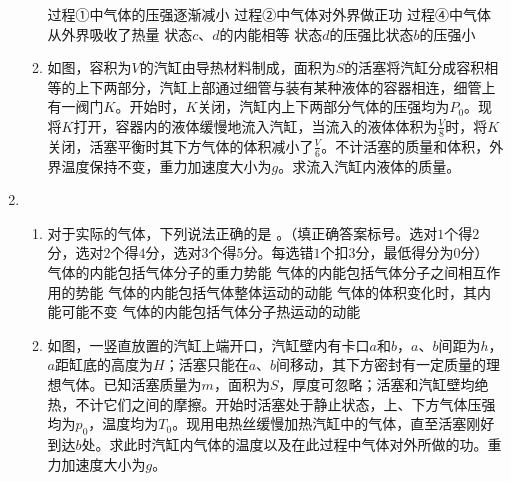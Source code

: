 \begin{enumerate}[leftmargin=0em]
\begin{enumerate}
\fivechoices
{过程①中气体的压强逐渐减小}
{过程②中气体对外界做正功}
{过程④中气体从外界吸收了热量}
{状态$ c $、$ d $的内能相等}
{状态$ d $的压强比状态$ b $的压强小}

\item 
如图，容积为$ V $的汽缸由导热材料制成，面积为$ S $的活塞将汽缸分成容积相等的上下两部分，汽缸上部通过细管与装有某种液体的容器相连，细管上有一阀门$ K $。开始时，$ K $关闭，汽缸内上下两部分气体的压强均为$ P_{0} $。现将$ K $打开，容器内的液体缓慢地流入汽缸，当流入的液体体积为$ \frac{V}{8} $时，将$ K $关闭，活塞平衡时其下方气体的体积减小了$ \frac{V}{6} $。不计活塞的质量和体积，外界温度保持不变，重力加速度大小为$ g $。求流入汽缸内液体的质量。

\begin{figure}[h!]
\flushright

\end{figure}








\end{enumerate}


\newpage
\item 
{}
\begin{enumerate}
\renewcommand{\labelenumi}{\arabic{enumi}.}
\item
对于实际的气体，下列说法正确的是  
。（填正确答案标号。选对$ 1 $个得$ 2 $分，选对$ 2 $个得$ 4 $分，选对$ 3 $个得$ 5 $分。每选错$ 1 $个扣$ 3 $分，最低得分为$ 0 $分）
\fivechoices
{气体的内能包括气体分子的重力势能}
{气体的内能包括气体分子之间相互作用的势能}
{气体的内能包括气体整体运动的动能}
{气体的体积变化时，其内能可能不变}
{气体的内能包括气体分子热运动的动能}

\item 
如图，一竖直放置的汽缸上端开口，汽缸壁内有卡口$ a $和$ b $，$ a $、$ b $间距为$ h $，$ a $距缸底的高度为$ H $；活塞只能在$ a $、$ b $间移动，其下方密封有一定质量的理想气体。已知活塞质量为$ m $，面积为$ S $，厚度可忽略；活塞和汽缸壁均绝热，不计它们之间的摩擦。开始时活塞处于静止状态，上、下方气体压强均为$ p_{0} $，温度均为$ T_{0} $。现用电热丝缓慢加热汽缸中的气体，直至活塞刚好到达$ b $处。求此时汽缸内气体的温度以及在此过程中气体对外所做的功。重力加速度大小为$ g $。
\begin{figure}[h!]
\flushright

\end{figure}


\end{enumerate}
\end{enumerate}
